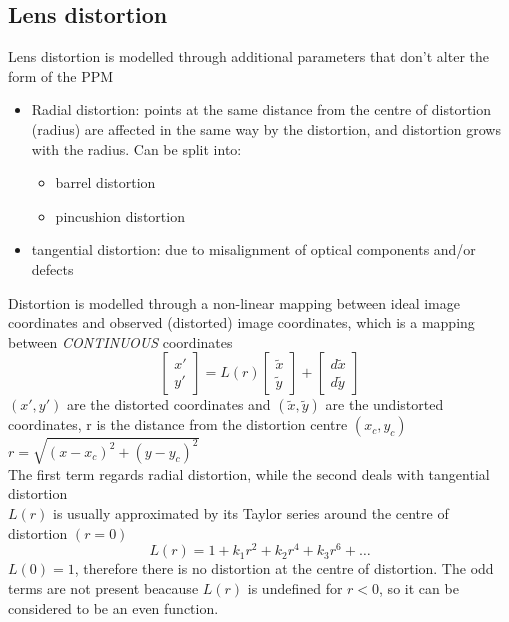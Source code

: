 \documentclass{article}
\begin{document}
\subsection{Lens distortion}
Lens distortion is modelled through additional parameters that don't alter the form of the PPM
\begin{itemize}
    \item Radial distortion: points at the same distance from the centre of distortion (radius) are affected in the same way by the distortion, and distortion grows with the radius. Can be split into: \begin{itemize}
        \item barrel distortion
        \item pincushion distortion
    \end{itemize}
    \item tangential distortion: due to misalignment of optical components and/or defects
\end{itemize}
Distortion is modelled through a non-linear mapping between ideal image coordinates and observed (distorted) image coordinates, which is a mapping between \emph{CONTINUOUS} coordinates
\begin{equation}
    \begin{bmatrix}
        x'\\
        y'
    \end{bmatrix}=L(r)\begin{bmatrix}
        \tilde{x}\\
        \tilde{y}
    \end{bmatrix}+\begin{bmatrix}
        d\tilde{x}\\
        d\tilde{y}
    \end{bmatrix}
\end{equation}
$(x', y')$ are the distorted coordinates and $(\tilde{x},\tilde{y})$ are the undistorted coordinates, r is the distance from the distortion centre $(x_c, y_c)$ $r=\sqrt{(x-x_c)^2+(y-y_c)^2}$\\
The first term regards radial distortion, while the second deals with tangential distortion\\
$L(r)$ is usually approximated by its Taylor series around the centre of distortion $(r=0)$
\begin{equation}
    L(r)=1+k_1r^2+k_2r^4+k_3r^6+\dots
\end{equation}
$L(0)=1$, therefore there is no distortion at the centre of distortion. The odd terms are not present beacause $L(r)$ is undefined for $r<0$, so it can be considered to be an even function.
\end{document}
